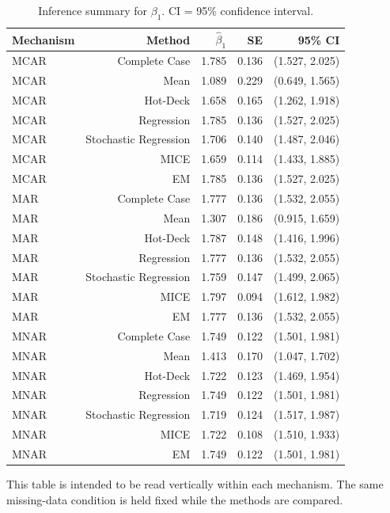 \documentclass[11pt,a4paper]{article}
\begin{document}
\begin{table}[H]
\centering
\small
\caption{Inference summary for $\beta_1$. CI = 95\% confidence interval.}
\begin{tabular}{lrrrr}
\toprule
Mechanism & Method & $\hat\beta_1$ & SE & 95\% CI\\
\midrule
MCAR & Complete Case & 1.785 & 0.136 & (1.527, 2.025)\\
MCAR & Mean & 1.089 & 0.229 & (0.649, 1.565)\\
MCAR & Hot-Deck & 1.658 & 0.165 & (1.262, 1.918)\\
MCAR & Regression & 1.785 & 0.136 & (1.527, 2.025)\\
MCAR & Stochastic Regression & 1.706 & 0.140 & (1.487, 2.046)\\
MCAR & MICE & 1.659 & 0.114 & (1.433, 1.885)\\
MCAR & EM & 1.785 & 0.136 & (1.527, 2.025)\\
\midrule
MAR & Complete Case & 1.777 & 0.136 & (1.532, 2.055)\\
MAR & Mean & 1.307 & 0.186 & (0.915, 1.659)\\
MAR & Hot-Deck & 1.787 & 0.148 & (1.416, 1.996)\\
MAR & Regression & 1.777 & 0.136 & (1.532, 2.055)\\
MAR & Stochastic Regression & 1.759 & 0.147 & (1.499, 2.065)\\
MAR & MICE & 1.797 & 0.094 & (1.612, 1.982)\\
MAR & EM & 1.777 & 0.136 & (1.532, 2.055)\\
\midrule
MNAR & Complete Case & 1.749 & 0.122 & (1.501, 1.981)\\
MNAR & Mean & 1.413 & 0.170 & (1.047, 1.702)\\
MNAR & Hot-Deck & 1.722 & 0.123 & (1.469, 1.954)\\
MNAR & Regression & 1.749 & 0.122 & (1.501, 1.981)\\
MNAR & Stochastic Regression & 1.719 & 0.124 & (1.517, 1.987)\\
MNAR & MICE & 1.722 & 0.108 & (1.510, 1.933)\\
MNAR & EM & 1.749 & 0.122 & (1.501, 1.981)\\
\bottomrule
\end{tabular}
\end{table}

This table is intended to be read vertically within each mechanism. The same missing-data condition is held fixed while the methods are compared.
\end{document}
